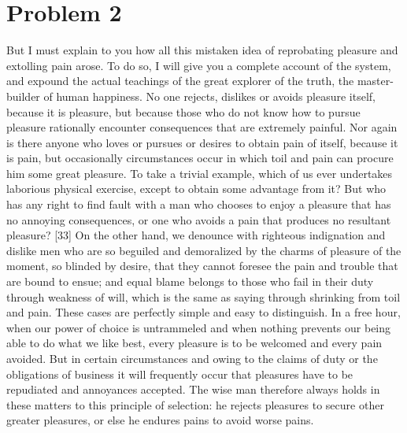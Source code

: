 \documentclass[letterpaper]{article}
\begin{document}
\section*{Problem 2}
\begin{ddanger}
[32] But I must explain to you how all this mistaken idea of reprobating pleasure and extolling pain arose. To do so, I will give you a complete account of the system, and expound the actual teachings of the great explorer of the truth, the master-builder of human happiness. No one rejects, dislikes or avoids pleasure itself, because it is pleasure, but because those who do not know how to pursue pleasure rationally encounter consequences that are extremely painful. Nor again is there anyone who loves or pursues or desires to obtain pain of itself, because it is pain, but occasionally circumstances occur in which toil and pain can procure him some great pleasure. To take a trivial example, which of us ever undertakes laborious physical exercise, except to obtain some advantage from it? But who has any right to find fault with a man who chooses to enjoy a pleasure that has no annoying consequences, or one who avoids a pain that produces no resultant pleasure? [33] On the other hand, we denounce with righteous indignation and dislike men who are so beguiled and demoralized by the charms of pleasure of the moment, so blinded by desire, that they cannot foresee the pain and trouble that are bound to ensue; and equal blame belongs to those who fail in their duty through weakness of will, which is the same as saying through shrinking from toil and pain. These cases are perfectly simple and easy to distinguish. In a free hour, when our power of choice is untrammeled and when nothing prevents our being able to do what we like best, every pleasure is to be welcomed and every pain avoided. But in certain circumstances and owing to the claims of duty or the obligations of business it will frequently occur that pleasures have to be repudiated and annoyances accepted. The wise man therefore always holds in these matters to this principle of selection: he rejects pleasures to secure other greater pleasures, or else he endures pains to avoid worse pains.
\hfill{}
\end{ddanger}
\end{document}
